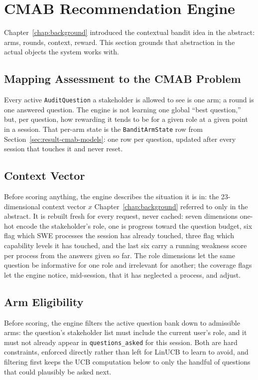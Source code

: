 \documentclass[a4paper, 12pt, oneside, openany, BCOR1cm,toc=chapterentrywithdots]{scrbook}
\begin{document}
\section{CMAB Recommendation Engine}
\label{sec:cmab-engine}

Chapter~\ref{chap:background} introduced the contextual bandit idea in the abstract: arms,
rounds, context, reward. This section grounds that abstraction in the actual objects the system
works with.

\subsection{Mapping Assessment to the CMAB Problem}

Every active \texttt{AuditQuestion} a stakeholder is allowed to see is one arm; a round is one
answered question. The engine is not learning one global ``best question,'' but, per question,
how rewarding it tends to be for a given role at a given point in a session. That per-arm state
is the \texttt{BanditArmState} row from Section~\ref{sec:result-cmab-models}: one row per
question, updated after every session that touches it and never reset.

\subsection{Context Vector}

Before scoring anything, the engine describes the situation it is in: the 23-dimensional context
vector $x$ Chapter~\ref{chap:background} referred to only in the abstract. It is rebuilt fresh
for every request, never cached: seven dimensions one-hot encode the stakeholder's role, one is
progress toward the question budget, six flag which SWE processes the session has already
touched, three flag which capability levels it has touched, and the last six carry a running
weakness score per process from the answers given so far. The role dimensions let the same
question be informative for one role and irrelevant for another; the coverage flags let the
engine notice, mid-session, that it has neglected a process, and adjust.

\subsection{Arm Eligibility}

Before scoring, the engine filters the active question bank down to admissible arms: the
question's stakeholder list must include the current user's role, and it must not already appear
in \texttt{questions\_asked} for this session. Both are hard constraints, enforced directly
rather than left for LinUCB to learn to avoid, and filtering first keeps the UCB computation
below to only the handful of questions that could plausibly be asked next.
\end{document}
